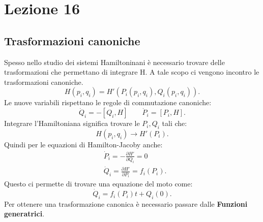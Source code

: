 \section{Lezione 16}%
\label{sub:Lezione 16}
\subsection{Trasformazioni canoniche}%
\label{sub:Trasformazioni canoniche}
Spesso nello studio dei sistemi Hamiltoninani è necessario trovare delle trasformazioni che permettano di integrare H. A tale scopo ci vengono incontro le trasformazioni canoniche.
\[
    H(p_i, q_i) = H'(P_i(p_i,q_i), Q_i(p_i, q_i) ) 
.\] 
Le nuove variabili rispettano le regole di commutazione canoniche:
\[
    \dot{Q}_i = - \left[ Q_i,H\right] \qquad \dot{P}_i = \left[P_i, H\right]
.\] 
Integrare l'Hamiltoniana significa trovare le $P_i, Q_i$  tali che:
\[
    H(p_i, q_i) \to H'(P_i) 
.\] 
Quindi per le equazioni di Hamilton-Jacoby anche:
\[\begin{aligned}
    & \dot{P}_i = - \frac{\partial H'}{\partial Q_i} =0\\
    & \dot{Q}_i = \frac{\partial H'}{\partial P_i} = f_i(P_i) 
.\end{aligned}\]
Questo ci permette di trovare una equazione del moto come:
\[
    \dot{Q}_i = f_i(P_i) t + Q_i(0) 
.\] 
Per ottenere una trasformazione canonica è necessario passare dalle \textbf{Funzioni generatrici}.

